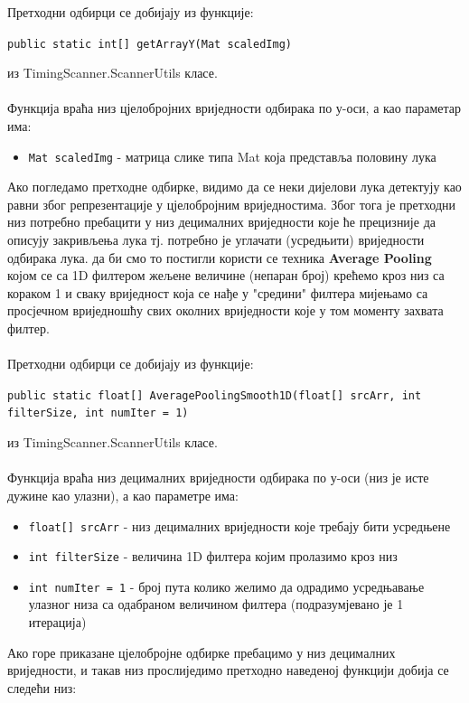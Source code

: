 \documentclass[12pt]{article}
\begin{document}
\vspace{0.5cm}
Претходни одбирци се добијају из функције: 
\begin{center}
\texttt{public static int[] getArrayY(Mat scaledImg)}
\end{center}
из TimingScanner.ScannerUtils класе.\\\\
Функција враћа низ цјелобројних вриједности одбирака по у-оси, а као параметар има:
\begin{itemize}
    \item \texttt{Mat scaledImg} - матрица слике типа Mat која представља половину лука
\end{itemize}

Ако погледамо претходне одбирке, видимо да се неки дијелови лука детектују као равни због репрезентације у цјелобројним вриједностима. Због тога је претходни низ потребно пребацити у низ децималних вриједности које ће прецизније да описују закривљења лука тј. потребно је углачати (усредњити) вриједности одбирака лука. да би смо то постигли користи се техника \textbf{Average Pooling} којом се са 1D филтером жељене величине (непаран број) крећемо кроз низ са кораком 1 и сваку вриједност која се нађе у "средини" филтера мијењамо са просјечном вриједношћу свих околних вриједности које у том моменту захвата филтер.\\\\
Претходни одбирци се добијају из функције: 
\begin{center}
\texttt{public static float[] AveragePoolingSmooth1D(float[] srcArr, int filterSize, int numIter = 1)}
\end{center}
из TimingScanner.ScannerUtils класе.\\\\
Функција враћа низ децималних вриједности одбирака по у-оси (низ је исте дужине као улазни), а као параметре има:
\begin{itemize}
    \item \texttt{float[] srcArr} - низ децималних вриједности које требају бити усредњене
    \item \texttt{int filterSize} - величина 1D филтера којим пролазимо кроз низ
    \item \texttt{int numIter = 1} - број пута колико желимо да одрадимо усредњавање улазног низа са одабраном величином филтера (подразумјевано је 1 итерација)
\end{itemize}
Ако горе приказане цјелобројне одбирке пребацимо у низ децималних вриједности, и такав низ прослиједимо претходно наведеној функцији добија се следећи низ:
\end{document}
